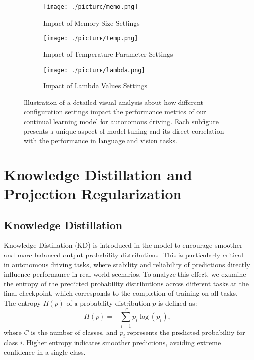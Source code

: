 \begin{figure*}[htbp]
  \centering
  \begin{subfigure}{.33\textwidth}
    \centering
    \texttt{[image: ./picture/memo.png]}  %
    \caption{Impact of Memory Size Settings}
    \label{fig Memory size}
  \end{subfigure}\hfill
  \begin{subfigure}{.33\textwidth}
    \centering
    \texttt{[image: ./picture/temp.png]}  %
    \caption{Impact of Temperature Parameter Settings}
    \label{fig temperature setting}
  \end{subfigure}\hfill
  \begin{subfigure}{.33\textwidth}
    \centering
    \texttt{[image: ./picture/lambda.png]}  %
    \caption{Impact of Lambda Values Settings}
    \label{fig lambda setting}
  \end{subfigure}\hfill
  \caption{Illustration of a detailed visual analysis about how different configuration settings impact the performance metrics of our continual learning model for autonomous driving. Each subfigure presents a unique aspect of model tuning and its direct correlation with the performance in language and vision tasks. }
\end{figure*}







\section{Knowledge Distillation and Projection Regularization}

\subsection{Knowledge Distillation}
Knowledge Distillation (KD) is introduced in the model to encourage smoother and more balanced output probability distributions. This is particularly critical in autonomous driving tasks, where stability and reliability of predictions directly influence performance in real-world scenarios. To analyze this effect, we examine the entropy of the predicted probability distributions across different tasks at the final checkpoint, which corresponds to the completion of training on all tasks. The entropy $H(p)$ of a probability distribution $p$ is defined as:
\begin{equation}
H(p) = - \sum_{i=1}^C p_i \log(p_i),
\end{equation}
where $C$ is the number of classes, and $p_i$ represents the predicted probability for class $i$. Higher entropy indicates smoother predictions, avoiding extreme confidence in a single class.


